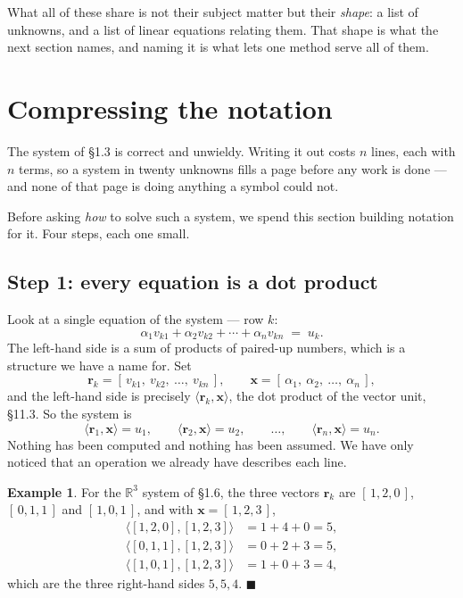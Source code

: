\documentclass[11pt]{article}
\theoremstyle{plain}
\theoremstyle{definition}
\newtheorem{ex}{Example}[section]
\theoremstyle{remark}
\newcommand{\R}{\mathbb{R}}
\newcommand{\vc}[1]{\mathbf{#1}}        %
\begin{document}
What all of these share is not their subject matter but their \emph{shape}: a
list of unknowns, and a list of linear equations relating them. That shape is
what the next section names, and naming it is what lets one method serve all of
them.

\section{Compressing the notation}
The system of \S1.3 is correct and unwieldy. Writing it out costs $n$ lines,
each with $n$ terms, so a system in twenty unknowns fills a page before any work
is done --- and none of that page is doing anything a symbol could not.

Before asking \emph{how} to solve such a system, we spend this section building
notation for it. Four steps, each one small.

\subsection{Step 1: every equation is a dot product}
Look at a single equation of the system --- row $k$:
\[
  \alpha_1 v_{k1} + \alpha_2 v_{k2} + \cdots + \alpha_n v_{kn}
  \;=\; u_k .
\]
The left-hand side is a sum of products of paired-up numbers, which is a
structure we have a name for. Set
\[
  \vc{r}_k = [\,v_{k1},\ v_{k2},\ \dots,\ v_{kn}\,],
  \qquad
  \vc{x}   = [\,\alpha_1,\ \alpha_2,\ \dots,\ \alpha_n\,] ,
\]
and the left-hand side is precisely $\langle\vc{r}_k,\vc{x}\rangle$, the dot
product of the vector unit, \S11.3. So the system is
\[
  \langle\vc{r}_1,\vc{x}\rangle = u_1,
  \qquad
  \langle\vc{r}_2,\vc{x}\rangle = u_2,
  \qquad \dots, \qquad
  \langle\vc{r}_n,\vc{x}\rangle = u_n .
\]
Nothing has been computed and nothing has been assumed. We have only noticed
that an operation we already have describes each line.

\begin{ex}
For the $\R^{3}$ system of \S1.6, the three vectors $\vc{r}_k$ are
$[\,1,2,0\,]$, $[\,0,1,1\,]$ and $[\,1,0,1\,]$, and with $\vc{x}=[\,1,2,3\,]$,
\[
  \begin{aligned}
    \langle[1,2,0],[1,2,3]\rangle &= 1+4+0 = 5, \\
    \langle[0,1,1],[1,2,3]\rangle &= 0+2+3 = 5, \\
    \langle[1,0,1],[1,2,3]\rangle &= 1+0+3 = 4 ,
  \end{aligned}
\]
which are the three right-hand sides $5,5,4$. \hfill$\blacksquare$
\end{ex}
\end{document}
